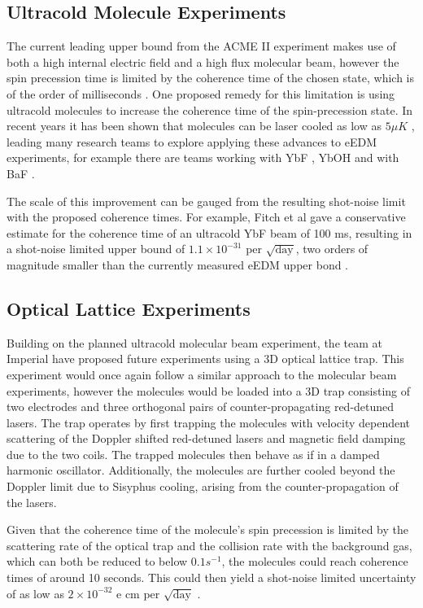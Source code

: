 \subsection{Ultracold Molecule Experiments}

The current leading upper bound from the ACME II experiment makes use of both a high internal electric field and a high flux molecular beam, however the spin precession time is limited by the coherence time of the chosen state, which is of the order of milliseconds \cite{Vutha_2010}. One proposed remedy for this limitation is using ultracold molecules to increase the coherence time of the spin-precession state. In recent years it has been shown that molecules can be laser cooled as low as $5 \mu K$ \cite{Caldwell_2019}, leading many research teams to explore applying these advances to eEDM experiments, for example there are teams working with YbF \cite{Tarbutt_2013}, YbOH \cite{Kozyryev_2017} and with BaF \cite{Aggarwal_2018}.

The scale of this improvement can be gauged from the resulting shot-noise limit with the proposed coherence times. For example, Fitch et al gave a  conservative estimate for the coherence time of an ultracold YbF beam of 100 ms, resulting in a shot-noise limited upper bound of $1.1 \times 10^{-31}$ per $\sqrt{\text{day}}$, two orders of magnitude smaller than the currently measured eEDM upper bond \cite{Fitch_2020}.

\subsection{Optical Lattice Experiments}

Building on the planned ultracold molecular beam experiment, the team at Imperial have proposed future experiments using a 3D optical lattice trap. This experiment would once again follow a similar approach to the molecular beam experiments, however the molecules would be loaded into a 3D trap consisting of two electrodes and three orthogonal pairs of counter-propagating red-detuned lasers. The trap operates by first trapping the molecules with velocity dependent scattering of the Doppler shifted red-detuned lasers and magnetic field damping due to the two coils. The trapped molecules then behave as if in a damped harmonic oscillator. Additionally, the molecules are further cooled beyond the Doppler limit due to Sisyphus cooling, arising from the counter-propagation of the lasers.

Given that the coherence time of the molecule's spin precession is limited by the scattering rate of the optical trap and the collision rate with the background gas, which can both be reduced to below $0.1 s^{-1}$, the molecules could reach coherence times of around 10 seconds. This could then yield a shot-noise limited uncertainty of as low as $2 \times 10^{-32}$ e cm per $\sqrt{\text{day}}$ \cite{Fitch_2020}.

